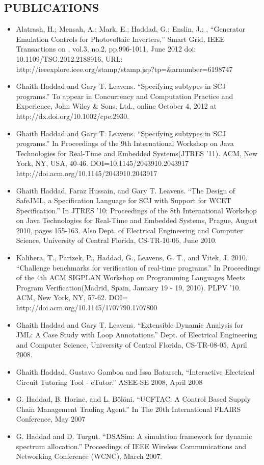 \documentclass[line,margin]{res}
\begin{document}
\begin{resume}
\section{PUBLICATIONS}
\begin{itemize} \itemsep -2pt
     \item Alatrash, H.; Mensah, A.; Mark, E.; Haddad, G.; Enslin, J.; ,
     ``Generator Emulation Controls for Photovoltaic Inverters,'' Smart Grid,
     IEEE Transactions on , vol.3, no.2, pp.996-1011, June 2012 doi:
     10.1109/TSG.2012.2188916, URL:
     http://ieeexplore.ieee.org/stamp/stamp.jsp?tp=\&arnumber=6198747
     \item Ghaith Haddad and Gary T. Leavens. ``Specifying subtypes in SCJ
     programs.'' To appear in Concurrency and Computation Practice and Experience,
     John Wiley \& Sons, Ltd., online October 4, 2012 at
     http://dx.doi.org/10.1002/cpe.2930.
     \item Ghaith Haddad and Gary T. Leavens. ``Specifying subtypes in SCJ
     programs.'' In Proceedings of the 9th International Workshop on Java
     Technologies for Real-Time and Embedded Systems(JTRES '11). ACM, New York,
     NY, USA, 40-46. DOI=10.1145/2043910.2043917
     http://doi.acm.org/10.1145/2043910.2043917
     \item Ghaith Haddad, Faraz Hussain, and Gary T. Leavens. ``The Design of
     SafeJML, a Specification Language for SCJ with Support for WCET
     Specification.'' In JTRES '10: Proceedings of the 8th International Workshop
     on Java Technologies for Real-Time and Embedded Systems, Prague, August
     2010, pages 155-163.
     Also Dept. of Electrical Engineering and Computer Science, University of
     Central Florida, CS-TR-10-06, June 2010.
     \item Kalibera, T., Parizek, P., Haddad, G., Leavens, G. T., and Vitek, J.
     2010. ``Challenge benchmarks for verification of real-time programs.'' In
     Proceedings of the 4th ACM SIGPLAN Workshop on Programming Languages Meets
     Program Verification(Madrid, Spain, January 19 - 19, 2010). PLPV '10. ACM,
     New York, NY, 57-62. DOI= http://doi.acm.org/10.1145/1707790.1707800
     \item Ghaith Haddad and Gary T. Leavens. ``Extensible Dynamic Analysis for
     JML: A Case Study with Loop Annotations.'' Dept. of Electrical Engineering
     and Computer Science, University of Central Florida, CS-TR-08-05, April
     2008.
     \item Ghaith Haddad, Gustavo Gamboa and Issa Batarseh, ``Interactive
     Electrical Circuit Tutoring Tool - eTutor.'' ASEE-SE 2008, April 2008
     \item G. Haddad, B. Horine, and L. B\"{o}l\"{o}ni. ``UCFTAC: A
     Control Based Supply Chain Management Trading Agent.'' In The 20th
     International FLAIRS Conference, May 2007
     \item G. Haddad and D. Turgut. ``DSASim: A simulation
     framework for dynamic spectrum allocation.'' Proceedings of IEEE Wireless
     Communications and Networking Conference (WCNC), March 2007.
\end{itemize}


\end{resume}
\end{document}
